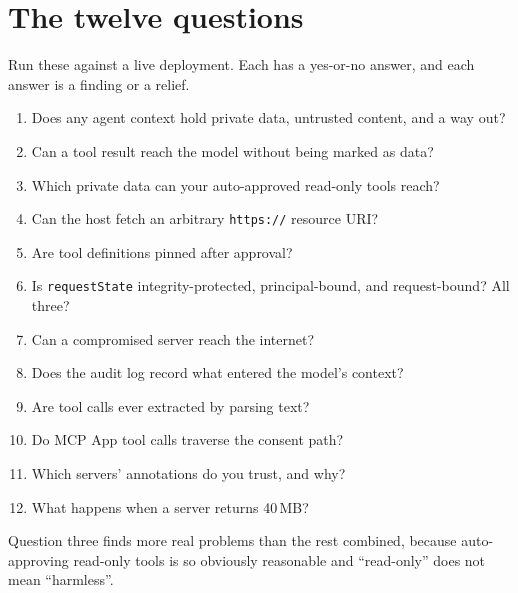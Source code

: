 \section{The twelve questions}

Run these against a live deployment. Each has a yes-or-no answer, and each
answer is a finding or a relief.

\begin{enumerate}[leftmargin=1.6em, itemsep=2pt]
\item Does any agent context hold private data, untrusted content, and a way out?
\item Can a tool result reach the model without being marked as data?
\item Which private data can your auto-approved read-only tools reach?
\item Can the host fetch an arbitrary \texttt{https://} resource URI?
\item Are tool definitions pinned after approval?
\item Is \texttt{requestState} integrity-protected, principal-bound, and
request-bound? All three?
\item Can a compromised server reach the internet?
\item Does the audit log record what entered the model's context?
\item Are tool calls ever extracted by parsing text?
\item Do MCP App tool calls traverse the consent path?
\item Which servers' annotations do you trust, and why?
\item What happens when a server returns 40\,MB?
\end{enumerate}

Question three finds more real problems than the rest combined, because
auto-approving read-only tools is so obviously reasonable and ``read-only'' does
not mean ``harmless''.

